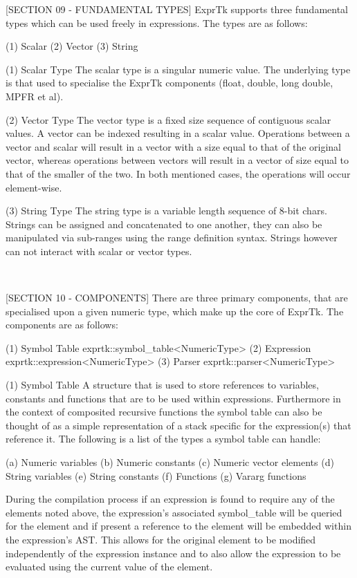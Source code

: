 [SECTION 09 - FUNDAMENTAL TYPES]
ExprTk supports three fundamental types which can be used freely in
expressions. The types are as follows:

(1) Scalar
(2) Vector
(3) String


(1) Scalar Type
The scalar type  is a singular  numeric value. The  underlying type is
that used  to specialise  the ExprTk  components (float,  double, long
double, MPFR et al).


(2) Vector Type
The vector type is a fixed size sequence of contiguous scalar  values.
A  vector  can be  indexed  resulting in  a  scalar value.  Operations
between a vector and scalar will result in a vector with a size  equal
to that  of the  original vector,  whereas operations  between vectors
will result in a  vector of size equal  to that of the  smaller of the
two. In both mentioned cases, the operations will occur element-wise.


(3) String Type
The string type is a variable length sequence of 8-bit chars.  Strings
can be  assigned and  concatenated to  one another,  they can  also be
manipulated via sub-ranges using the range definition syntax.  Strings
however can not interact with scalar or vector types.

~~~~~~~~~~~~~~~~~~~~~~~~~~~~~~~~~~~~~~~~~~~~~~~~~~~~~~~~~~

[SECTION 10 - COMPONENTS]
There are three primary components, that are specialised upon a  given
numeric type, which make up the core of ExprTk. The components are  as
follows:

(1) Symbol Table  exprtk::symbol\_table<NumericType>
(2) Expression    exprtk::expression<NumericType>
(3) Parser        exprtk::parser<NumericType>


(1) Symbol Table
A structure that is used  to store references to variables,  constants
and functions that are to  be used within expressions. Furthermore  in
the context  of composited  recursive functions  the symbol  table can
also be thought of as a simple representation of a stack specific  for
the expression(s) that reference it. The following is a list of the
types a symbol table can handle:

(a) Numeric variables
(b) Numeric constants
(c) Numeric vector elements
(d) String variables
(e) String constants
(f) Functions
(g) Vararg functions

During the compilation  process if an  expression is found  to require
any  of  the  elements   noted  above,  the  expression's   associated
symbol\_table  will  be  queried  for  the  element  and  if  present a
reference to the element will be embedded within the expression's AST.
This allows for the original  element to be modified independently  of
the  expression  instance  and  to also  allow  the  expression  to be
evaluated using the current value of the element.

